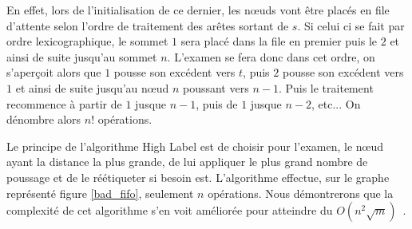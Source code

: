 En effet, lors de l'initialisation de ce dernier, les n\oe uds vont être placés en file d'attente
selon l'ordre de traitement des arêtes sortant de $s$. Si celui ci se fait par ordre
lexicographique, le sommet $1$ sera placé dans la file en premier puis le $2$ et ainsi de suite
jusqu'au sommet $n$. L'examen se fera donc dans cet ordre, on s'aperçoit alors que $1$ pousse son
excédent vers $t$, puis $2$ pousse son excédent vers $1$ et ainsi de suite jusqu'au n\oe ud $n$
poussant vers $n-1$.
Puis le traitement recommence à partir de $1$ jusque $n-1$, puis de $1$ jusque $n-2$, etc... On
dénombre alors $n!$ opérations.

Le principe de l'algorithme High Label est de choisir pour l'examen, le n\oe ud ayant la distance la
plus grande, de lui appliquer le plus grand nombre de poussage et de le réétiqueter si besoin est.
L'algorithme effectue, sur le graphe représenté figure \ref{bad_fifo}, seulement $n$ opérations.
Nous démontrerons que la complexité de cet algorithme s'en voit améliorée pour atteindre du
$O(n^2\sqrt{m})$~\cite{ahuj93}.
